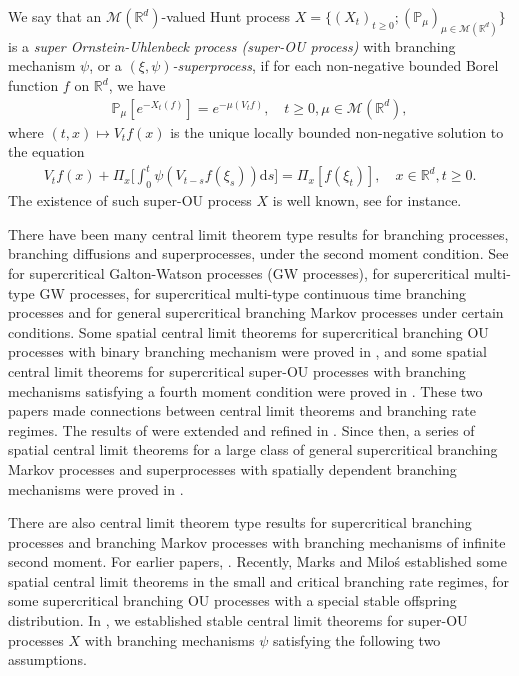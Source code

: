 \documentclass[12pt,a4paper]{amsart}
\theoremstyle{plain}
\theoremstyle{definition}
\numberwithin{equation}{section}
\begin{document}
We say that an $\mathcal M(\mathbb R^d)$-valued Hunt process $X = \{(X_t)_{t\geq 0}; (\mathbb{P}_{\mu})_{\mu \in \mathcal M(\mathbb R^d)}\}$
is a \emph{super Ornstein-Uhlenbeck process (super-OU process)} with branching mechanism $\psi$, or a \emph{$(\xi, \psi)$-superprocess}, if for each non-negative bounded Borel function $f$ on $\mathbb R^d$, we have
\begin{align}
  \label{eq: def of V_t}
  \mathbb{P}_{\mu}[e^{-X_t(f)}]
  = e^{-\mu(V_tf)}
  , \quad t\geq 0, \mu \in \mathcal M(\mathbb R^d),
\end{align}
	where $(t,x) \mapsto V_tf(x)$ is the unique locally bounded non-negative solution to the equation
\begin{align}
  V_tf(x) + \Pi_x \Big[ \int_0^t\psi (V_{t-s}f(\xi_s) ) \mathrm ds\Big]
	= \Pi_x [f(\xi_t)]
  , \quad x\in \mathbb R^d, t\geq 0.
\end{align}	
	The existence of such super-OU process $X$ is well known, see \cite{Dynkin1993Superprocesses} for instance.

	There have been many central limit theorem type results for branching processes, branching diffusions and superprocesses, under the second moment condition.
	See \cite{Heyde1970A-rate, HeydeBrown1871An-invariance, HeydeLeslie1971Improved} for supercritical Galton-Watson processes (GW processes), \cite{KestenStigum1966Additional,KestenStigum1966A-limit} for supercritical multi-type GW processes, \cite{Athreya1969Limit,Athreya1969LimitB,Athreya1971Some} for supercritical multi-type continuous time branching processes and \cite{AsmussenHering1983Branching} for general supercritical branching Markov processes under certain conditions.
	Some spatial central limit theorems for supercritical branching OU processes with binary branching mechanism were proved 
	in \cite{AdamczakMilos2015CLT}, and some 
	spatial central limit theorems for supercritical super-OU processes with branching mechanisms satisfying a fourth moment condition were proved in \cite{Milos2012Spatial}.
	These two papers made connections between central limit theorems and branching rate regimes.
	The results of \cite{Milos2012Spatial} were extended and refined in \cite{RenSongZhang2014Central}.
		Since then, a series of spatial central limit theorems for a large class of general supercritical branching Markov processes and superprocesses with spatially dependent branching mechanisms were proved in \cite{RenSongZhang2014CentralB,RenSongZhang2015Central,RenSongZhang2017Central}.

There are also  central  limit theorem type results for supercritical branching processes and branching Markov processes with branching mechanisms of infinite second moment. For earlier
papers, \cite{Heyde1971Some, Asmussen76Convergence}. 	Recently, Marks and Milo\'s \cite{MarksMilos2018CLT} established some spatial central limit theorems in the small and critical branching rate regimes, for 
some supercritical branching OU processes with a special stable offspring distribution.
In \cite{RenSongSunZhao2019Stable}, we
established stable central limit theorems for 
super-OU processes $X$ with branching mechanisms $\psi$ satisfying the following two assumptions.
\end{document}
